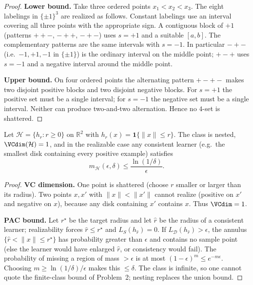 \begin{proof}
\textbf{Lower bound.}
Take three ordered points $x_1<x_2<x_3$. The eight labelings in $\{\pm1\}^3$ are realized as follows. Constant labelings use an interval covering all three points with the appropriate sign. A contiguous block of $+1$ (patterns $++-$, $-++$, $-+-$) uses $s=+1$ and a suitable $[a,b]$. The complementary patterns are the same intervals with $s=-1$. In particular $-+-$ (i.e.\ $-1,+1,-1$ in $\{\pm1\}$) is the ordinary interval on the middle point; $+-+$ uses $s=-1$ and a negative interval around the middle point.

\textbf{Upper bound.}
On four ordered points the alternating pattern $+-+-$ makes two disjoint positive blocks and two disjoint negative blocks. For $s=+1$ the positive set must be a single interval; for $s=-1$ the negative set must be a single interval. Neither can produce two-and-two alternation. Hence no $4$-set is shattered.
\end{proof}

\begin{proposition}
\label{prop:mlu-circles}
Let $\mathcal{H}=\{h_r:r\ge 0\}$ on $\mathbb{R}^2$ with $h_r(x)=\mathbf{1}\{\lVert x\rVert\le r\}$. The class is nested, $\VCdim(\mathcal{H})=1$, and in the realizable case any consistent learner (e.g.\ the smallest disk containing every positive example) satisfies
\[
m_{\mathcal{H}}(\epsilon,\delta)
\le
\frac{\ln(1/\delta)}{\epsilon}.
\]
\end{proposition}

\begin{proof}
\textbf{VC dimension.}
One point is shattered (choose $r$ smaller or larger than its radius). Two points $x,x'$ with $\lVert x\rVert<\lVert x'\rVert$ cannot realize (positive on $x'$ and negative on $x$), because any disk containing $x'$ contains $x$. Thus $\VCdim=1$.

\textbf{PAC bound.}
Let $r^\star$ be the target radius and let $\widehat{r}$ be the radius of a consistent learner; realizability forces $\widehat{r}\le r^\star$ and $L_S(h_{\widehat{r}})=0$. If $L_{\mathcal{D}}(h_{\widehat{r}})>\epsilon$, the annulus $\{\widehat{r}<\lVert x\rVert\le r^\star\}$ has probability greater than $\epsilon$ and contains no sample point (else the learner would have enlarged $\widehat{r}$, or consistency would fail). The probability of missing a region of mass $>\epsilon$ is at most $(1-\epsilon)^m\le e^{-m\epsilon}$. Choosing $m\ge\ln(1/\delta)/\epsilon$ makes this $\le\delta$. The class is infinite, so one cannot quote the finite-class bound of Problem~2; nesting replaces the union bound.
\end{proof}

